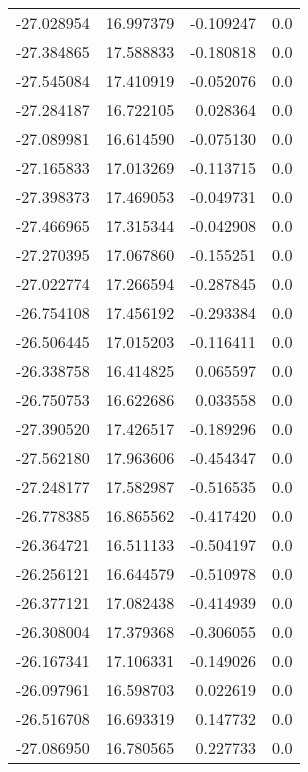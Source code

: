 \begin{tabular}{rrrr}
      -27.028954 &        16.997379 &   -0.109247 &   0.0 \\
      -27.384865 &        17.588833 &   -0.180818 &   0.0 \\
      -27.545084 &        17.410919 &   -0.052076 &   0.0 \\
      -27.284187 &        16.722105 &    0.028364 &   0.0 \\
      -27.089981 &        16.614590 &   -0.075130 &   0.0 \\
      -27.165833 &        17.013269 &   -0.113715 &   0.0 \\
      -27.398373 &        17.469053 &   -0.049731 &   0.0 \\
      -27.466965 &        17.315344 &   -0.042908 &   0.0 \\
      -27.270395 &        17.067860 &   -0.155251 &   0.0 \\
      -27.022774 &        17.266594 &   -0.287845 &   0.0 \\
      -26.754108 &        17.456192 &   -0.293384 &   0.0 \\
      -26.506445 &        17.015203 &   -0.116411 &   0.0 \\
      -26.338758 &        16.414825 &    0.065597 &   0.0 \\
      -26.750753 &        16.622686 &    0.033558 &   0.0 \\
      -27.390520 &        17.426517 &   -0.189296 &   0.0 \\
      -27.562180 &        17.963606 &   -0.454347 &   0.0 \\
      -27.248177 &        17.582987 &   -0.516535 &   0.0 \\
      -26.778385 &        16.865562 &   -0.417420 &   0.0 \\
      -26.364721 &        16.511133 &   -0.504197 &   0.0 \\
      -26.256121 &        16.644579 &   -0.510978 &   0.0 \\
      -26.377121 &        17.082438 &   -0.414939 &   0.0 \\
      -26.308004 &        17.379368 &   -0.306055 &   0.0 \\
      -26.167341 &        17.106331 &   -0.149026 &   0.0 \\
      -26.097961 &        16.598703 &    0.022619 &   0.0 \\
      -26.516708 &        16.693319 &    0.147732 &   0.0 \\
      -27.086950 &        16.780565 &    0.227733 &   0.0 \\

\end{tabular}
